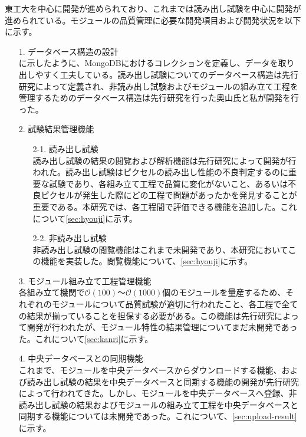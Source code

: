 東工大を中心に開発が進められており、これまでは読み出し試験を中心に開発が進められている。モジュールの品質管理に必要な開発項目および開発状況を以下に示す。
\begin{itemize}
  \item[1.] データベース構造の設計 \\
  に示したように、MongoDBにおけるコレクションを定義し、データを取り出しやすく工夫している。読み出し試験についてのデータベース構造は先行研究\cite{kimu,kubotan}によって定義され、非読み出し試験およびモジュールの組み立て工程を管理するためのデータベース構造は先行研究\cite{oku}を行った奥山氏と私が開発を行った。
  \item[2.] 試験結果管理機能
  \begin{itemize}
    \item[2-1.] 読み出し試験 \\
    読み出し試験の結果の閲覧および解析機能は先行研究\cite{oku,kubotan}によって開発が行われた。読み出し試験はピクセルの読み出し性能の不良判定するのに重要な試験であり、各組み立て工程で品質に変化がないこと、あるいは不良ピクセルが発生した際にどの工程で問題があったかを発見することが重要である。本研究では、各工程間で評価できる機能を追加した。これについて\ref{sec:hyouji}に示す。
    \item[2-2.] 非読み出し試験 \\
    非読み出し試験の閲覧機能はこれまで未開発であり、本研究においてこの機能を実装した。閲覧機能について、\ref{sec:hyouji}に示す。
  \end{itemize}
  \item[3.] モジュール組み立て工程管理機能 \\
  各組み立て機関で$\mathcal{O}(100)$〜$\mathcal{O}(1000)$個のモジュールを量産するため、それぞれのモジュールについて品質試験が適切に行われたこと、各工程で全ての結果が揃っていることを担保する必要がある。この機能は先行研究\cite{oku}によって開発が行われたが、モジュール特性の結果管理についてまだ未開発であった。これについて\ref{sec:kanri}に示す。
  \item[4.] 中央データベースとの同期機能 \\
  これまで、モジュールを中央データベースからダウンロードする機能、および読み出し試験の結果を中央データベースと同期する機能の開発が先行研究\cite{oku}によって行われてきた。しかし、モジュールを中央データベースへ登録、非読み出し試験の結果およびモジュールの組み立て工程を中央データベースと同期する機能については未開発であった。これについて、\ref{sec:upload-result}に示す。
\end{itemize}






\newpage
